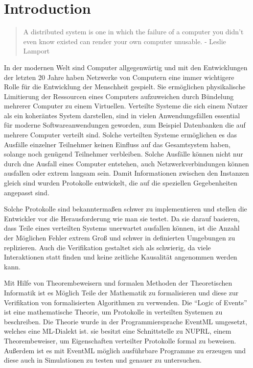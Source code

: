 
\section{Introduction}
\label{sec_1}

\begin{quote}
A distributed system is one in which the failure of a computer you didn't even
know existed can render your own computer unusable. - Leslie Lamport
\end{quote}

In der modernen Welt sind Computer allgegenwärtig und mit den Entwicklungen
der letzten 20 Jahre haben Netzwerke von Computern eine immer wichtigere Rolle
für die Entwicklung der Menschheit gespielt. Sie ermöglichen physikalische
Limitierung der Ressourcen eines Computers aufzuweichen durch Bündelung
mehrerer Computer zu einem Virtuellen. Verteilte Systeme die sich einem Nutzer
als ein koheräntes System darstellen, sind in vielen Anwendungsfällen essential
für moderne Softwareanwendungen geworden, zum Beispiel Datenbanken die
auf mehrere Computer verteilt sind. Solche verteilten Systeme ermöglichen
es das Ausfälle einzelner Teilnehmer keinen Einfluss auf das Gesamtsystem haben,
solange noch genügend Teilnehmer verbleiben. Solche Ausfälle können nicht nur
durch dne Ausfall eines Computer entstehen, auch Netzwerkverbindungen können
ausfallen oder extrem langsam sein. Damit Informationen zwischen den
Instanzen gleich sind wurden Protokolle entwickelt, die auf die speziellen
Gegebenheiten angepasst sind.

Solche Protokolle sind bekanntermaßen schwer zu implementieren und stellen
die Entwickler vor die Herausforderung wie man sie testet. Da sie darauf
basieren, dass Teile eines verteilten Systems unerwartet ausfallen können,
ist die Anzahl der Möglichen Fehler extrem Groß und schwer in definierten
Umgebungen zu replizieren. Auch die Verifikation gestaltet sich als
schwierig, da viele Interaktionen statt finden und keine zeitliche
Kausalität angenommen werden kann.

Mit Hilfe von Theorembeweisern und formalen Methoden der Theoretischen
Informatik ist es Möglich Teile der Mathematik zu formalisieren und
diese zur Verifikation von formalisierten Algorithmen zu verwenden.
Die ``Logic of Events'' ist eine mathematische Theorie, um Protokolle
in verteilten Systemen zu beschreiben.
Die Theorie wurde in der Programmiersprache EventML umgesetzt, welches eine
ML-Dialekt ist. sie besitzt eine Schnittstelle zu NUPRL, einem Theorembeweiser,
um Eigenschaften verteilter Protokolle formal zu beweisen.
Außerdem ist es mit EventML möglich ausführbare Programme zu erzeugen und
diese auch in Simulationen zu testen und genauer zu untersuchen.

